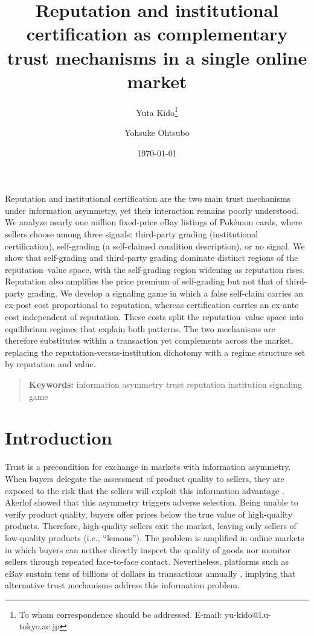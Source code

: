\documentclass[11pt,letterpaper]{article}
\title{Reputation and institutional certification as complementary trust mechanisms in a single online market}
\author[1,2]{Yuta Kido\thanks{To whom correspondence should be addressed. E-mail: yu-kido@l.u-tokyo.ac.jp}}
\author[1]{Yohsuke Ohtsubo}
\affil[1]{Graduate School of Humanities and Sociology, The University of Tokyo, Tokyo 113-0033, Japan}
\affil[2]{Japan Society for the Promotion of Science, Tokyo 102-0083, Japan}
\date{\today}
\renewenvironment{abstract}{%
  \begin{center}%
    {\bfseries \abstractname\vspace{-.5em}}%
  \end{center}%
  \quotation
}{\endquotation}
\theoremstyle{definition}
\begin{document}
\maketitle

\vspace{-20pt}

\begin{abstract}
Reputation and institutional certification are the two main trust mechanisms under information asymmetry, yet their interaction remains poorly understood. We analyze nearly one million fixed-price eBay listings of Pokémon cards, where sellers choose among three signals: third-party grading (institutional certification), self-grading (a self-claimed condition description), or no signal. We show that self-grading and third-party grading dominate distinct regions of the reputation--value space, with the self-grading region widening as reputation rises. Reputation also amplifies the price premium of self-grading but not that of third-party grading. We develop a signaling game in which a false self-claim carries an ex-post cost proportional to reputation, whereas certification carries an ex-ante cost independent of reputation. These costs split the reputation--value space into equilibrium regimes that explain both patterns. The two mechanisms are therefore substitutes within a transaction yet complements across the market, replacing the reputation-versus-institution dichotomy with a regime structure set by reputation and value.
\end{abstract}

\begin{quotation}
\noindent\centering\textbf{Keywords:} information asymmetry \textbar{} trust \textbar{} reputation \textbar{} institution \textbar{} signaling game
\end{quotation}

\medskip

\section*{Introduction}

\noindent Trust is a precondition for exchange in markets with information asymmetry. When buyers delegate the assessment of product quality to sellers, they are exposed to the risk that the sellers will exploit this information advantage \citep{Coleman1990}. Akerlof \cite{Akerlof1970} showed that this asymmetry triggers adverse selection. Being unable to verify product quality, buyers offer prices below the true value of high-quality products. Therefore, high-quality sellers exit the market, leaving only sellers of low-quality products (i.e., ``lemons''). The problem is amplified in online markets in which buyers can neither directly inspect the quality of goods nor monitor sellers through repeated face-to-face contact. Nevertheless, platforms such as eBay sustain tens of billions of dollars in transactions annually \citep{eBay2025_10K}, implying that alternative trust mechanisms address this information problem.
\end{document}
